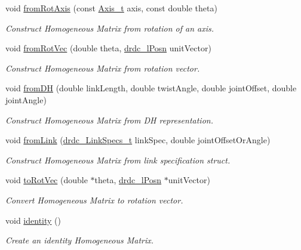 \begin{CompactItemize}
void \hyperlink{classdrdc__HMatrix_c51b27e0651263aacb0aee7c7815f5e6}{fromRotAxis} (const \hyperlink{libdrdc_8h_32b2eaf8bafc891ec8018cbe48d39243}{Axis\_\-t} axis, const double theta)
\begin{CompactList}\small\item\em Construct Homogeneous Matrix from rotation of an axis. \item\end{CompactList}\item 
void \hyperlink{classdrdc__HMatrix_c96a446ac4ed830ae94ea7259d711788}{fromRotVec} (double theta, \hyperlink{classdrdc__lPosn}{drdc\_\-lPosn} unitVector)
\begin{CompactList}\small\item\em Construct Homogeneous Matrix from rotation vector. \item\end{CompactList}\item 
void \hyperlink{classdrdc__HMatrix_a264908dfdd69262c02b7e041ec12f20}{fromDH} (double linkLength, double twistAngle, double jointOffset, double jointAngle)
\begin{CompactList}\small\item\em Construct Homogeneous Matrix from DH representation. \item\end{CompactList}\item 
void \hyperlink{classdrdc__HMatrix_4005e8dacfae57ad94af32c58f69b443}{fromLink} (\hyperlink{structdrdc__LinkSpecs__t}{drdc\_\-LinkSpecs\_\-t} linkSpec, double jointOffsetOrAngle)
\begin{CompactList}\small\item\em Construct Homogeneous Matrix from link specification struct. \item\end{CompactList}\item 
void \hyperlink{classdrdc__HMatrix_2eb122e8c6debc51f4c290ce9a3ffbc2}{toRotVec} (double $\ast$theta, \hyperlink{classdrdc__lPosn}{drdc\_\-lPosn} $\ast$unitVector)
\begin{CompactList}\small\item\em Convert Homogeneous Matrix to rotation vector. \item\end{CompactList}\item 
void \hyperlink{classdrdc__HMatrix_47b76fbb959993241a3b00e7bd2ffae5}{identity} ()
\begin{CompactList}\small\item\em Create an identity Homogeneous Matrix. \item\end{CompactList}\item 

\end{CompactItemize}

